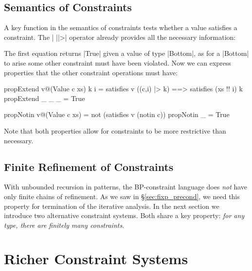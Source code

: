\subsection{Semantics of Constraints}

A key function in the semantics of constraints tests whether a value satisfies a constraint. The | ||>| operator already provides all the necessary information:

\noindent\begin{minipage}{\linewidth}
\end{minipage}

The first equation returns |True| given a value of type |Bottom|, as for a |Bottom| to arise some other constraint must have been violated. Now we can express properties that the other constraint operations must have:

\begin{code}
propExtend  v@(Value c xs) k i =
    satisfies v ((c,i) |> k) ==> satisfies (xs !! i) k
propExtend _ _ _ = True

propNotin  v@(Value c xs) = not (satisfies v (notin c))
propNotin  _ = True
\end{code}

\noindent Note that both properties allow for constraints to be more restrictive than necessary.

\subsection{Finite Refinement of Constraints}
\label{sec:bounded}

With unbounded recursion in patterns, the BP-constraint language does \textit{not} have only finite chains of refinement. As we saw in \S\ref{sec:fixp_precond}, we need this property for termination of the iterative analysis. In the next section we introduce two alternative constraint systems. Both share a key property: \textit{for any type, there are finitely many constraints}.


\section{Richer Constraint Systems}
\label{sec:constraint}


